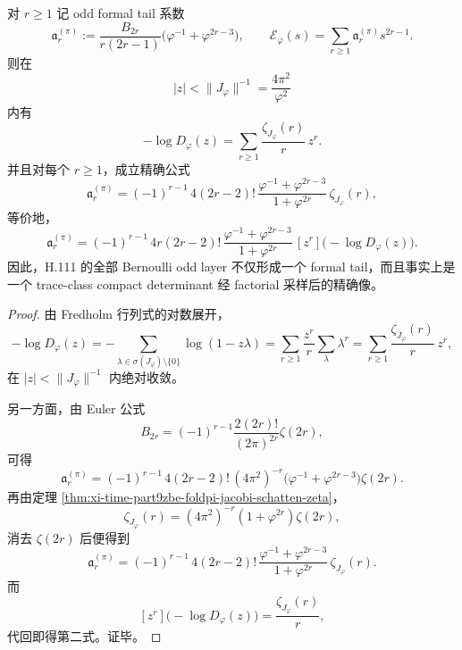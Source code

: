 \begin{theorem}\label{thm:xi-time-part9zbe-foldpi-compact-determinant-sampling}
对 \(r\ge 1\) 记 odd formal tail 系数
\[
\mathfrak a_r^{(\pi)}
:=
\frac{B_{2r}}{r(2r-1)}
\bigl(\varphi^{-1}+\varphi^{2r-3}\bigr),
\qquad
\mathcal E_\varphi(s)=\sum_{r\ge 1}\mathfrak a_r^{(\pi)}s^{2r-1}.
\]
则在
\[
|z|<\|J_\varphi\|^{-1}=\frac{4\pi^2}{\varphi^2}
\]
内有
\[
-\log D_\varphi(z)
=
\sum_{r\ge 1}\frac{\zeta_{J_\varphi}(r)}{r}\,z^r.
\]
并且对每个 \(r\ge 1\)，成立精确公式
\[
\mathfrak a_r^{(\pi)}
=
(-1)^{r-1}\,
4(2r-2)!\,
\frac{\varphi^{-1}+\varphi^{2r-3}}{1+\varphi^{2r}}\,
\zeta_{J_\varphi}(r),
\]
等价地，
\[
\mathfrak a_r^{(\pi)}
=
(-1)^{r-1}\,
4r(2r-2)!\,
\frac{\varphi^{-1}+\varphi^{2r-3}}{1+\varphi^{2r}}\,
[z^r]\bigl(-\log D_\varphi(z)\bigr).
\]
因此，H.111 的全部 Bernoulli odd layer 不仅形成一个 formal tail，而且事实上是一个 trace-class compact determinant 经 factorial 采样后的精确像。
\end{theorem}
\begin{proof}
由 Fredholm 行列式的对数展开，
\[
-\log D_\varphi(z)
=
-\sum_{\lambda\in \sigma(J_\varphi)\setminus\{0\}}\log(1-z\lambda)
=
\sum_{r\ge 1}\frac{z^r}{r}\sum_{\lambda}\lambda^r
=
\sum_{r\ge 1}\frac{\zeta_{J_\varphi}(r)}{r}\,z^r,
\]
在 \(|z|<\|J_\varphi\|^{-1}\) 内绝对收敛。

另一方面，由 Euler 公式
\[
B_{2r}
=
(-1)^{r-1}\frac{2(2r)!}{(2\pi)^{2r}}\zeta(2r),
\]
可得
\[
\mathfrak a_r^{(\pi)}
=
(-1)^{r-1}\,
4(2r-2)!\,
(4\pi^2)^{-r}
\bigl(\varphi^{-1}+\varphi^{2r-3}\bigr)\zeta(2r).
\]
再由定理 \ref{thm:xi-time-part9zbe-foldpi-jacobi-schatten-zeta}，
\[
\zeta_{J_\varphi}(r)
=(4\pi^2)^{-r}(1+\varphi^{2r})\zeta(2r),
\]
消去 \(\zeta(2r)\) 后便得到
\[
\mathfrak a_r^{(\pi)}
=
(-1)^{r-1}\,
4(2r-2)!\,
\frac{\varphi^{-1}+\varphi^{2r-3}}{1+\varphi^{2r}}\,
\zeta_{J_\varphi}(r).
\]
而
\[
[z^r]\bigl(-\log D_\varphi(z)\bigr)=\frac{\zeta_{J_\varphi}(r)}{r},
\]
代回即得第二式。证毕。
\end{proof}

